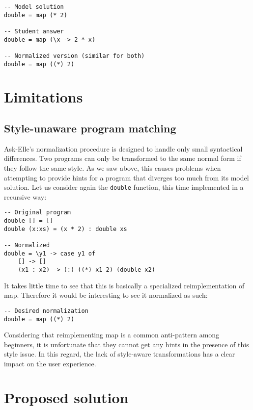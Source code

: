 \begin{verbatim}
-- Model solution
double = map (* 2)

-- Student answer
double = map (\x -> 2 * x)

-- Normalized version (similar for both)
double = map ((*) 2)
\end{verbatim}

\section{Limitations}

\subsection{Style-unaware program matching}

Ask-Elle's normalization procedure is designed to handle only small syntactical differences. Two programs can only be transformed to the same normal form if they follow the same style. As we saw above, this causes problems when attempting to provide hints for a program that diverges too much from its model solution. Let us consider again the \texttt{double} function, this time implemented in a recursive way:

\begin{verbatim}
-- Original program
double [] = []
double (x:xs) = (x * 2) : double xs

-- Normalized
double = \y1 -> case y1 of
    [] -> []
    (x1 : x2) -> (:) ((*) x1 2) (double x2)
\end{verbatim}

It takes little time to see that this is basically a specialized reimplementation of map. Therefore it would be interesting to see it normalized as such:

\begin{verbatim}
-- Desired normalization
double = map ((*) 2)
\end{verbatim}

Considering that reimplementing map is a common anti-pattern among beginners, it is unfortunate that they cannot get any hints in the presence of this style issue. In this regard, the lack of style-aware transformations has a clear impact on the user experience.

\section{Proposed solution}

